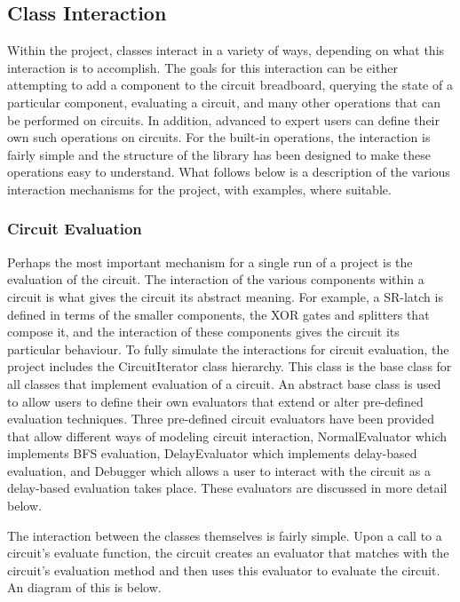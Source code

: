 \documentclass{article}
\begin{document}
\subsection{Class Interaction}

Within the project, classes interact in a variety of ways, depending on what this interaction is to accomplish. The goals for this interaction can be either attempting to add a component to the circuit breadboard, querying the state of a particular component, evaluating a circuit, and many other operations that can be performed on circuits. In addition, advanced to expert users can define their own such operations on circuits. For the built-in operations, the interaction is fairly simple and the structure of the library has been designed to make these operations easy to understand. What follows below is a description of the various interaction mechanisms for the project, with examples, where suitable.

\subsubsection{Circuit Evaluation}

Perhaps the most important mechanism for a single run of a project is the evaluation of the circuit. The interaction of the various components within a circuit is what gives the circuit its abstract meaning. For example, a SR-latch is defined in terms of the smaller components, the XOR gates and splitters that compose it, and the interaction of these components gives the circuit its particular behaviour. To fully simulate the interactions for circuit evaluation, the project includes the CircuitIterator class hierarchy. This class is the base class for all classes that implement evaluation of a circuit.  An abstract base class is used to allow users to define their own evaluators that extend or alter pre-defined evaluation techniques. Three pre-defined circuit evaluators have been provided that allow different ways of modeling circuit interaction, NormalEvaluator which implements BFS evaluation, DelayEvaluator which implements delay-based evaluation, and Debugger which allows a user to interact with the circuit as a delay-based evaluation takes place. These evaluators are discussed in more detail below.

The interaction between the classes themselves is fairly simple. Upon a call to a circuit’s evaluate function, the circuit creates an evaluator that matches with the circuit’s evaluation method and then uses this evaluator to evaluate the circuit. An diagram of this is below.
\end{document}
